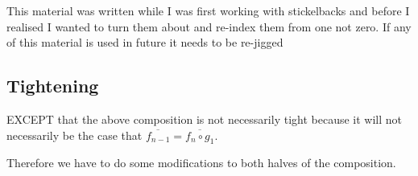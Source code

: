 

\begin{notebox}
This material was written while I was first working with stickelbacks and before I realised
I wanted to turn them about and re-index them from one not zero. If any of this material
is used in future it needs to be re-jigged 
\end{notebox}
\subsection{Tightening}
EXCEPT that the above composition is not necessarily tight because
it will not necessarily be the case that $\overline{f_{n-1}}=\overline{f_n\circ g_1}$.

Therefore we have to do some modifications to both halves of the composition.

